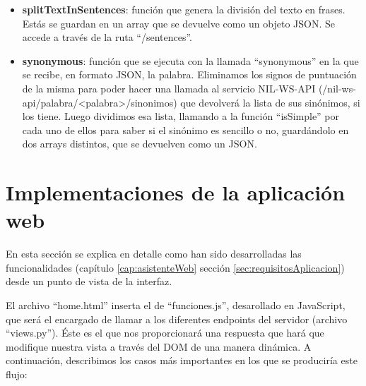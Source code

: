 \begin{itemize}
	\item \textbf{splitTextInSentences}: función que genera la división del texto en frases. Estás se guardan en un array que se devuelve como un objeto JSON. Se accede a través de la ruta ``/sentences''.
	
	\item \textbf{synonymous}: función que se ejecuta con la llamada ``synonymous'' en la que se recibe, en formato JSON, la palabra. Eliminamos los signos de puntuación de la misma para poder hacer una llamada al servicio NIL-WS-API (/nil-ws-api/palabra/<palabra>/sinonimos) que devolverá la lista de sus sinónimos, si los tiene.
	Luego dividimos esa lista, llamando a la función ``isSimple'' por cada uno de ellos para saber si el sinónimo es sencillo o no, guardándolo en dos arrays distintos, que se devuelven como un JSON.
	
\end{itemize}

\section{Implementaciones de la aplicación web}\label{subsec:implementacionAplicacionWeb}

En esta sección se explica en detalle como han sido desarrolladas las funcionalidades (capítulo \ref{cap:asistenteWeb} sección \ref{sec:requisitosAplicacion}) desde un punto de vista de la interfaz. 

El archivo ``home.html'' inserta el de ``funciones.js'', desarollado en JavaScript, que será el encargado de llamar a los diferentes endpoints del servidor (archivo ``views.py''). Éste es el que nos proporcionará una respuesta que hará que modifique nuestra vista a través del DOM de una manera dinámica. A continuación, describimos los casos más importantes en los que se produciría este flujo:




